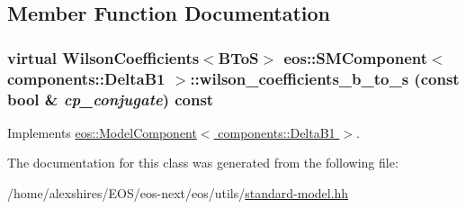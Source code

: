 \subsection{Member Function Documentation}
\hypertarget{classeos_1_1SMComponent_3_01components_1_1DeltaB1_01_4_a4a3c9906daaf0be6c682245e0467a316}{
\subsubsection[{wilson\_\-coefficients\_\-b\_\-to\_\-s}]{\setlength{\rightskip}{0pt plus 5cm}virtual WilsonCoefficients$<${\bf BToS}$>$ eos::SMComponent$<$ components::DeltaB1 $>$::wilson\_\-coefficients\_\-b\_\-to\_\-s (const bool \& {\em cp\_\-conjugate}) const}}
\label{classeos_1_1SMComponent_3_01components_1_1DeltaB1_01_4_a4a3c9906daaf0be6c682245e0467a316}


Implements \hyperlink{classeos_1_1ModelComponent_3_01components_1_1DeltaB1_01_4_a94a836d0f2518023cca37a1ffaa128e9}{eos::ModelComponent$<$ components::DeltaB1 $>$}.

The documentation for this class was generated from the following file:\begin{DoxyCompactItemize}
\item 
/home/alexshires/EOS/eos-\/next/eos/utils/\hyperlink{standard-model_8hh}{standard-\/model.hh}\end{DoxyCompactItemize}
